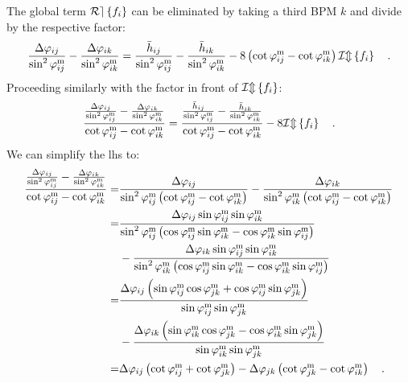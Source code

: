 The global term $\mathcal{Re} \left\{ f_i \right\}$ can be eliminated by taking a third BPM $k$ and divide by the respective factor:
\begin{equation}
	\frac{\Delta\varphi_{ij}}{\sin^2\varphi_{ij}^\text{m}} - \frac{\Delta\varphi_{ik}}{\sin ^2\varphi_{ik}^\text{m}}
  =
	\frac{
    \bar{h}_{ij}
  }{
    \sin^2\varphi_{ij}^\text{m}
  } -
  \frac{
    \bar{h}_{ik }
  }{
    \sin^2\varphi_{ik}^\text{m}
  }
  - 8\left(\cot\varphi_{ij}^\text{m} - \cot\varphi_{ik}^\text{m}\right)\mathcal{Im} \left\{ f_i \right\}
    \quad .
    \label{eq_Deltaphi_first_step}
\end{equation} 
Proceeding similarly with the factor in front of $\mathcal{Im} \left\{ f_i \right\}$:
\begin{equation}
  \frac{
    \frac{\Delta\varphi_{ij}}{\sin^2\varphi_{ij}^\text{m}} - \frac{\Delta\varphi_{ik}}{\sin ^2\varphi_{ik}^\text{m}}
  }{
    \cot\varphi_{ij}^\text{m} - \cot\varphi_{ik}^\text{m} } =
  \frac{
    \frac{ \bar{h}_{ij} }{ \sin^2\varphi_{ij}^\text{m} } -
    \frac{ \bar{h}_{ik } }{ \sin^2\varphi_{ik}^\text{m} }
  }{
    \cot\varphi_{ij}^\text{m} - \cot\varphi_{ik}^\text{m}
  }
  - 8\mathcal{Im} \left\{ f_i \right\}
    \quad .
    \label{eq_Deltaphi_second_step}
\end{equation} 
We can simplify the lhs to:
{
\small
  \begin{align}
  \frac{
    \frac{\Delta\varphi_{ij}}{\sin^2\varphi_{ij}^\text{m}} - \frac{\Delta\varphi_{ik}}{\sin ^2\varphi_{ik}^\text{m}}
  }{
  \cot\varphi_{ij}^\text{m} - \cot\varphi_{ik}^\text{m} }
  =&  \frac{\Delta\varphi_{ij}}{
    \sin^2\varphi_{ij}^\text{m} \left( \cot\varphi_{ij}^\text{m} - \cot\varphi_{ik}^\text{m} \right)
  }
  -
  \frac{\Delta\varphi_{ik}}{
    \sin^2\varphi_{ik}^\text{m} \left( \cot\varphi_{ij}^\text{m} - \cot\varphi_{ik}^\text{m} \right)
  } \notag \\
  =&
  \frac{
    \Delta\varphi_{ij}\sin\varphi_{ij}^\text{m} \sin\varphi_{ik}^\text{m}
  }{
    \sin^2\varphi_{ij}^\text{m} \left( \cos\varphi_{ij}^\text{m} \sin\varphi_{ik}^\text{m} - \cos\varphi_{ik}^\text{m}\sin\varphi_{ij}^\text{m} \right)
  }\notag \\
  &-
  \frac{
    \Delta\varphi_{ik}\sin\varphi_{ij}^\text{m} \sin\varphi_{ik}^\text{m}
  }{
    \sin^2\varphi_{ik}^\text{m} \left( \cos\varphi_{ij}^\text{m} \sin\varphi_{ik}^\text{m} - \cos\varphi_{ik}^\text{m}\sin\varphi_{ij}^\text{m} \right)
  } \notag  \\
  =& 
  \frac{
    \Delta\varphi_{ij}\left( 
    \sin \varphi_{ij}^\text{m} \cos \varphi_{jk}^\text{m} + \cos \varphi_{ij}^\text{m} \sin\varphi_{jk}^\text{m}\right)
  }{
    \sin\varphi_{ij}^\text{m} \sin \varphi_{jk}^\text{m}
  } \notag \\
  &-
  \frac{
    \Delta\varphi_{ik}\left( 
    \sin \varphi_{ik}^\text{m} \cos \varphi_{jk}^\text{m} - \cos \varphi_{ik}^\text{m} \sin\varphi_{jk}^\text{m}\right)
  }{
    \sin\varphi_{ik}^\text{m} \sin \varphi_{jk}^\text{m}
  } \notag \\
  =&
  \Delta\varphi_{ij} \left( 
    \cot \varphi_{ij}^\text{m} + \cot\varphi_{jk}^\text{m}
  \right)
  -
  \Delta\varphi_{jk} \left( 
    \cot\varphi_{jk}^\text{m} - \cot\varphi_{ik}^\text{m}
  \right)
  \quad .
\end{align}
}

